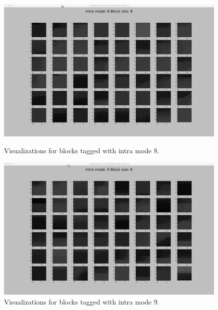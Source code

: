 \begin{figure}
        \vspace*{1cm} %
    
        \begin{minipage}{0.49\textwidth}
            \includegraphics[width=\linewidth]{Figures/visu-size8x8/8-8}
            \caption[Visualizations for blocks tagged with intra mode 8]{Visualizations for blocks tagged with intra mode 8.}
            \label{fig:size8_mode8}
        \end{minipage}
        \hspace{\fill} %
        \begin{minipage}{0.49\textwidth}
            \includegraphics[width=\linewidth]{Figures/visu-size8x8/8-9}
            \caption[Visualizations for blocks tagged with intra mode 9]{Visualizations for blocks tagged with intra mode 9.}
            \label{fig:size8_mode9}
        \end{minipage}
    \end{figure}
    
